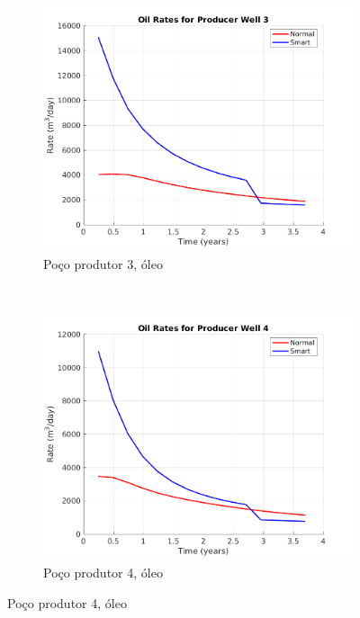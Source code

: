 \begin{figure}[!ht]
	\begin{subfigure}[b]{.45\textwidth}
		\includegraphics[width=\textwidth]{figs/resultadosSSAIGUP/SSAIGUP_OilWell3_Zoom}
		\caption{Po\c{c}o produtor 3, \'{o}leo}
		\label{SSAIGUP_OilWell3}
	\end{subfigure}
	~
	\begin{subfigure}[b]{.45\textwidth}
		\includegraphics[width=\textwidth]{figs/resultadosSSAIGUP/SSAIGUP_OilWell4_Zoom}
		\caption{Po\c{c}o produtor 4, \'{o}leo}
		\label{SSAIGUP_OilWell4}
	\end{subfigure}
	

\end{figure}
